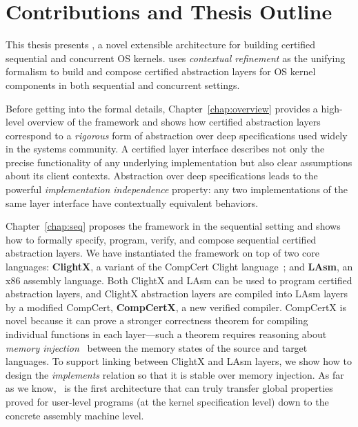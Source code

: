 \section{Contributions and Thesis Outline}
\label{sec:intro:contribution}

This thesis presents \CTOS{}, a novel extensible architecture
for building certified sequential and concurrent OS kernels.
\CTOS{} uses {\em contextual
    refinement} as the unifying formalism to build and
    compose certified abstraction layers for OS kernel components
in both sequential and concurrent settings. 

Before getting into the formal details,
Chapter~\ref{chap:overview}
provides a high-level overview of
the \CTOS{} framework
and  shows how 
certified
  abstraction layers  correspond to a {\em rigorous} 
  form of abstraction over deep specifications used widely
  in the systems community. A certified layer interface
  describes not only the precise functionality of any underlying
  implementation but also clear assumptions about its client contexts.
  Abstraction over deep specifications leads to the powerful
  {\em implementation independence} property: 
  any two implementations
  of the same layer interface have contextually equivalent behaviors.
  
Chapter~\ref{chap:seq} proposes 
the \CTOS{} framework in the sequential setting
and shows how to formally specify,
program, verify, and compose sequential certified abstraction layers. 
We have instantiated the framework on top of two core
  languages: {\bf
    ClightX}, a variant of the CompCert Clight
  language~\cite{blazy-leroy-clight}; and {\bf LAsm}, an x86 assembly
  language.  Both ClightX and LAsm can be used to program certified
  abstraction layers,
  and ClightX abstraction layers are compiled into 
  LAsm layers by a modified CompCert,
  {\bf CompCertX}, a new verified compiler.
    CompCertX is novel because it can prove a stronger
  correctness theorem for compiling individual functions in each
  layer---such a theorem requires reasoning about {\em memory
    injection}~\cite{leroy08} between the memory states of the source
  and target languages.  To support linking between ClightX and LAsm
  layers, we show how to design the {\em implements} relation so that it
  is stable over memory injection.
    As far as we
  know, \CTOS\ is the first architecture that can truly transfer
  global properties proved for user-level programs (at the kernel
  specification level) down to the concrete assembly machine level.
  
